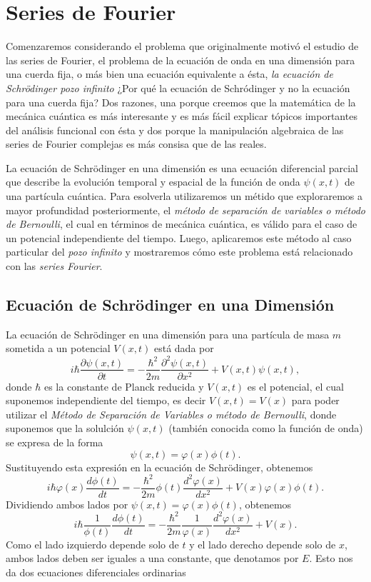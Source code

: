 \documentclass[main.tex]{subfiles}
\begin{document}
\chapter{Series de Fourier}\label{cap2}
\noindent Comenzaremos considerando el problema que originalmente motivó el estudio de las series de Fourier, el problema de la ecuación de onda en una dimensión para una cuerda fija, o más bien una ecuación equivalente a ésta, \emph{la ecuación de Schrödinger pozo infinito} ¿Por qué la ecuación de Schródinger y no la ecuación para una cuerda fija? Dos razones, una porque creemos que la matemática de la mecánica cuántica es más interesante y es más fácil explicar tópicos importantes del análisis funcional con ésta y dos porque la manipulación algebraica de las series de Fourier complejas es más consisa que de las reales.

La ecuación de Schrödinger en una dimensión es una ecuación diferencial parcial que describe la evolución temporal y espacial de la función de onda \(\psi(x, t)\) de una partícula cuántica. Para esolverla utilizaremos  un métido que exploraremos a mayor profundidad posteriormente, el \emph{método de separación de variables o método de Bernoulli}, el cual en términos de mecánica cuántica, es válido para el caso de un potencial independiente del tiempo. Luego, aplicaremos este método al caso particular del \emph{pozo infinito} y mostraremos cómo este problema está relacionado con las \emph{series Fourier}.

\section{Ecuación de Schrödinger en una Dimensión}\label{cap2-schro}

La ecuación de Schrödinger en una dimensión para una partícula de masa \(m\) sometida a un potencial \(V(x,t)\) está dada por
\[
i\hbar \frac{\partial \psi(x, t)}{\partial t} = -\frac{\hbar^2}{2m} \frac{\partial^2 \psi(x, t)}{\partial x^2} + V(x,t) \psi(x, t),
\]
donde \(\hbar\) es la constante de Planck reducida y \(V(x,t)\) es el potencial, el cual suponemos independiente del tiempo, es decir \(V(x,t)=V(x)\) para poder utilizar el \emph{Método de Separación de Variables o método de Bernoulli}, donde suponemos que la solulción \(\psi(x, t)\) (también conocida como la función de onda) se expresa de la forma
\[
\psi(x, t) = \varphi(x) \phi(t).
\]
Sustituyendo esta expresión en la ecuación de Schrödinger, obtenemos
\[
i\hbar \varphi(x) \frac{d \phi(t)}{dt} = -\frac{\hbar^2}{2m} \phi(t) \frac{d^2 \varphi(x)}{dx^2} + V(x) \varphi(x) \phi(t).
\]
Dividiendo ambos lados por \(\psi(x, t) = \varphi(x) \phi(t)\), obtenemos
\[
i\hbar \frac{1}{\phi(t)} \frac{d \phi(t)}{dt} = -\frac{\hbar^2}{2m} \frac{1}{\varphi(x)} \frac{d^2 \varphi(x)}{dx^2} + V(x).
\]
Como el lado izquierdo depende solo de \(t\) y el lado derecho depende solo de \(x\), ambos lados deben ser iguales a una constante, que denotamos por \(E\). Esto nos da dos ecuaciones diferenciales ordinarias
\end{document}
